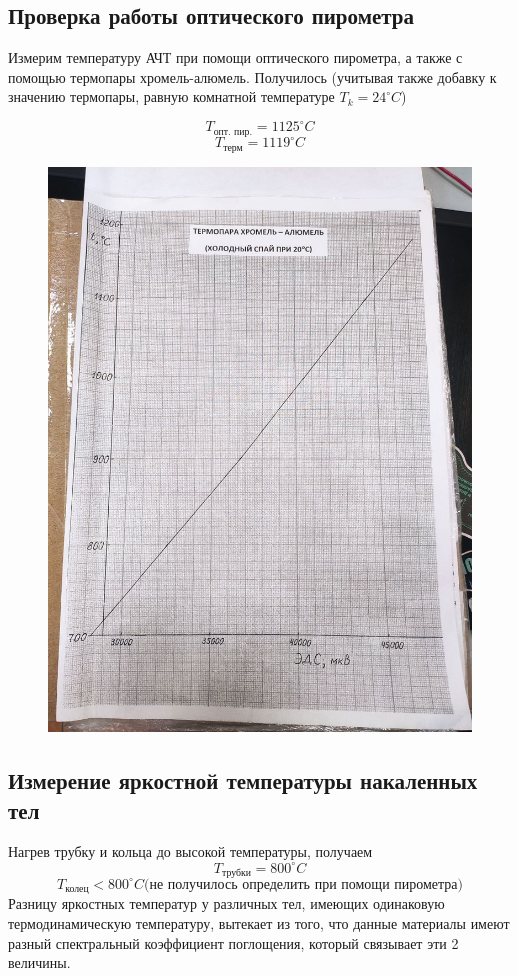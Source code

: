 \documentclass[a4paper,12pt]{article}
\begin{document}
\subsection*{Проверка работы оптического пирометра}
Измерим температуру АЧТ при помощи оптического пирометра, а также с помощью термопары хромель-алюмель. Получилось (учитывая также добавку к значению термопары, равную комнатной температуре $T_k = 24^\circ C$)

\[T_\text{опт. пир.} = 1125^\circ C\]
\[T_\text{терм} = 1119^\circ C\]

\begin{figure}[H]
\centering
\includegraphics[scale=0.2]{graph.jpg}
\end{figure}

\subsection*{Измерение яркостной температуры накаленных тел}
Нагрев трубку и кольца до высокой температуры, получаем
\[T_\text{трубки} = 800^\circ C\]
\[T_\text{колец} < 800 ^\circ C\text{(не получилось определить при помощи пирометра)}\]
Разницу яркостных температур у различных тел, имеющих одинаковую термодинамическую температуру, вытекает из того, что данные материалы имеют разный спектральный коэффициент поглощения, который связывает эти 2 величины.
\end{document}
